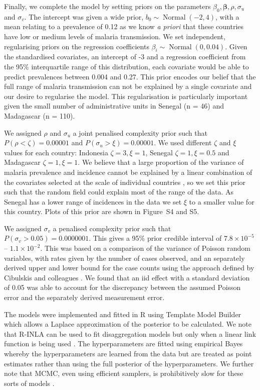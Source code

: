 \documentclass{statsoc}
\begin{document}
Finally, we complete the model by setting priors on the parameters $\beta_0, \boldsymbol\beta, \rho, \sigma_u$ and $\sigma_v$.
The intercept was given a wide prior, $b_0 \sim \operatorname{Normal}(-2, 4)$, with a mean relating to a prevalence of 0.12 as we know \emph{a priori} that these countries have low or medium levels of malaria transmission.
We set independent, regularising priors on the regression coefficients $\beta_i \sim \operatorname{Normal}(0, 0.04)$. 
Given the standardised covariates, an intercept of -3 and a regression coefficient from the 95\% interquartile range of this distribution, each covariate would be able to predict prevalences between 0.004 and 0.27. 
This prior encodes our belief that the full range of malaria transmission can not be explained by a single covariate and our desire to regularise the model.
This regularisation is particularly important given the small number of administrative units in Senegal (n = 46) and Madagascar (n = 110).

We assigned $\rho$ and $\sigma_u$ a joint penalised complexity prior \citep{fuglstad2018constructing} such that $P(\rho < \zeta) = 0.00001$ and $P(\sigma_u > \xi) = 0.00001$.
We used different $\zeta$  and $\xi$ values for each country: Indonesia $\zeta = 3, \xi = 1$, Senegal $\zeta = 1, \xi = 0.5$ and Madagascar $\zeta = 1, \xi = 1$.
We believe that a large proportion of the variance of malaria prevalence and incidence cannot be explained by a linear combination of the covariates selected at the scale of individual countries \citep{bhatt2017improved}, so we set this prior such that the random field could explain most of the range of the data.
As Senegal has a lower range of incidences in the data we set $\xi$ to a smaller value for this country.
Plots of this prior are shown in Figure~S4 and S5.

We assigned $\sigma_v$ a penalised complexity prior \citep{simpson2017penalising} such that $P(\sigma_v > 0.05) = 0.0000001$.
This gives a 95\% prior credible interval of $7.8\times 10^{-5}$ -- $1.1\times 10^{-2}$.
This was based on a comparison of the variance of Poisson random variables, with rates given by the number of cases observed, and an separately derived upper and lower bound for the case counts using the approach defined by Cibulskis and colleagues \citep{cibulskis2011worldwide}.
We found that an iid effect with a standard deviation of 0.05 was able to account for the discrepancy between the assumed Poisson error and the separately derived measurement error.

The models were implemented and fitted in R \citep{R} using Template Model Builder \citep{TMB} which allows a Laplace approximation of the posterior to be calculated.
We note that R-INLA \citep{INLA} can be used to fit disaggregation models but only when a linear link function is being used \citep{wilson2017pointless}.
The hyperparameters are fitted using empirical Bayes whereby the hyperparameters are learned from the data but are treated as point estimates rather than using the full posterior of the hyperparameters.
We further note that MCMC, even using efficient samplers, is prohibitively slow for these sorts of models \citep{nandi2020disaggregation}. 
\end{document}
